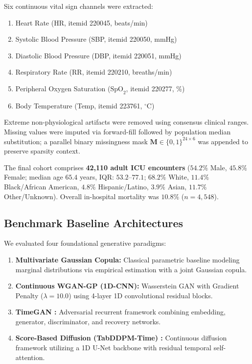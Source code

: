 \documentclass[journal]{IEEEtran}
\begin{document}
Six continuous vital sign channels were extracted:
\begin{enumerate}
    \item Heart Rate (HR, itemid 220045, beats/min)
    \item Systolic Blood Pressure (SBP, itemid 220050, mmHg)
    \item Diastolic Blood Pressure (DBP, itemid 220051, mmHg)
    \item Respiratory Rate (RR, itemid 220210, breaths/min)
    \item Peripheral Oxygen Saturation ($\text{SpO}_2$, itemid 220277, \%)
    \item Body Temperature (Temp, itemid 223761, $^\circ\text{C}$)
\end{enumerate}

Extreme non-physiological artifacts were removed using consensus clinical ranges. Missing values were imputed via forward-fill followed by population median substitution; a parallel binary missingness mask $\mathbf{M} \in \{0, 1\}^{24 \times 6}$ was appended to preserve sparsity context.

The final cohort comprises \textbf{42,110 adult ICU encounters} ($54.2\%$ Male, $45.8\%$ Female; median age $65.4$ years, IQR: $53.2$--$77.1$; $68.2\%$ White, $11.4\%$ Black/African American, $4.8\%$ Hispanic/Latino, $3.9\%$ Asian, $11.7\%$ Other/Unknown). Overall in-hospital mortality was $10.8\%$ ($n = 4,548$).

\subsection{Benchmark Baseline Architectures}
We evaluated four foundational generative paradigms:
\begin{enumerate}
    \item \textbf{Multivariate Gaussian Copula:} Classical parametric baseline modeling marginal distributions via empirical estimation with a joint Gaussian copula.
    \item \textbf{Continuous WGAN-GP (1D-CNN):} Wasserstein GAN with Gradient Penalty ($\lambda = 10.0$) using 4-layer 1D convolutional residual blocks.
    \item \textbf{TimeGAN \cite{yoon2019timegan}:} Adversarial recurrent framework combining embedding, generator, discriminator, and recovery networks.
    \item \textbf{Score-Based Diffusion (TabDDPM-Time) \cite{kotelnikov2023tabddpm}:} Continuous diffusion framework utilizing a 1D U-Net backbone with residual temporal self-attention.
\end{enumerate}
\end{document}
